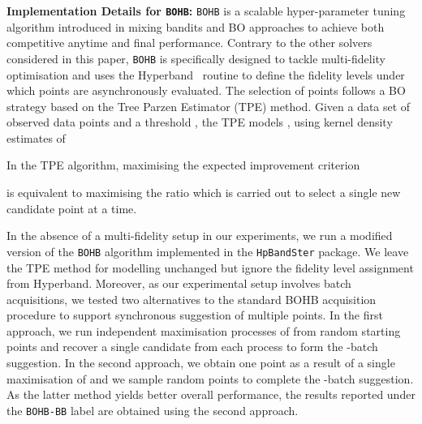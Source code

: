 \documentclass[jair,twoside,11pt,theapa]{article}
\let\cite\shortcite
\theoremstyle{definition}
\begin{document}
\noindent \textbf{Implementation Details for \texttt{BOHB}:} \texttt{BOHB} is a scalable hyper-parameter tuning algorithm introduced in \cite{falkner2018bohb} mixing bandits and BO approaches to achieve both competitive anytime and final performance. Contrary to the other solvers considered in this paper, \texttt{BOHB} is specifically designed to tackle multi-fidelity optimisation and uses the Hyperband~\cite{li2017hyperband} routine to define the fidelity levels under which points are asynchronously evaluated. The selection of points follows a BO strategy based on the Tree Parzen Estimator (TPE) method. Given a data set  of observed data points and a threshold , the TPE models , using kernel density estimates of 

 In the TPE algorithm, maximising the expected improvement criterion
   
 is equivalent to maximising the ratio     which is carried out to select a single new candidate point at a time.

In the absence of a multi-fidelity setup in our experiments, we run a modified version of the \texttt{BOHB} algorithm implemented in the \texttt{HpBandSter} package. We leave the TPE method for modelling unchanged but ignore the fidelity level assignment from Hyperband. Moreover, as our experimental setup involves batch acquisitions, we tested two alternatives to the standard BOHB acquisition procedure to support synchronous suggestion of multiple points. In the first approach, we run  independent maximisation processes of  from random starting points and recover a single candidate from each process to form the -batch suggestion. In the second approach, we obtain one point as a result of a single maximisation of  and we sample  random points to complete the -batch suggestion. As the latter method yields better overall performance, the results reported under the \texttt{BOHB-BB} label are obtained using the second approach.
\end{document}
